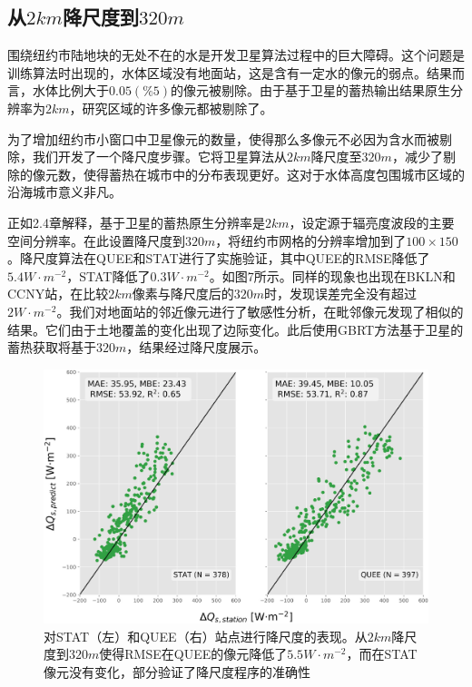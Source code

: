 \documentclass[3p,times]{elsarticle}
\begin{document}
\subsection{从$2km$降尺度到$320m$}

围绕纽约市陆地块的无处不在的水是开发卫星算法过程中的巨大障碍。这个问题是训练算法时出现的，水体区域没有地面站，这是含有一定水的像元的弱点。结果而言，水体比例大于$0.05(\%5)$的像元被剔除。由于基于卫星的蓄热输出结果原生分辨率为$2km$，研究区域的许多像元都被剔除了。

为了增加纽约市小窗口中卫星像元的数量，使得那么多像元不必因为含水而被剔除，我们开发了一个降尺度步骤。它将卫星算法从$2km$降尺度至$320m$，减少了剔除的像元数，使得蓄热在城市中的分布表现更好。这对于水体高度包围城市区域的沿海城市意义非凡。

正如2.4章解释，基于卫星的蓄热原生分辨率是$2km$，设定源于辐亮度波段的主要空间分辨率。在此设置降尺度到$320m$，将纽约市网格的分辨率增加到了$100\times150$。降尺度算法在QUEE和STAT进行了实施验证，其中QUEE的RMSE降低了$5.4W\cdot m^{-2}$，STAT降低了$0.3W\cdot m^{-2}$。如图7所示。同样的现象也出现在BKLN和CCNY站，在比较$2km$像素与降尺度后的$320m$时，发现误差完全没有超过$2W\cdot m^{-2}$。我们对地面站的邻近像元进行了敏感性分析，在毗邻像元发现了相似的结果。它们由于土地覆盖的变化出现了边际变化。此后使用GBRT方法基于卫星的蓄热获取将基于$320m$，结果经过降尺度展示。

\begin{figure}[htbp]
    \begin{center}
        \includegraphics[width=\linewidth]{img/图7.png}
    \end{center}
    \caption{对STAT（左）和QUEE（右）站点进行降尺度的表现。从$2km$降尺度到$320m$使得RMSE在QUEE的像元降低了$5.5W\cdot m^{-2}$，而在STAT像元没有变化，部分验证了降尺度程序的准确性}
\end{figure}
\end{document}
